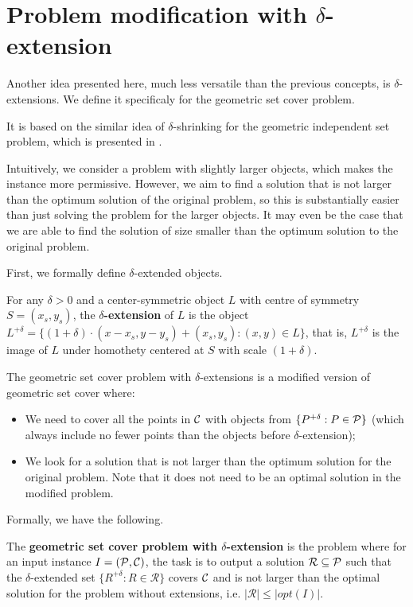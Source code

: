 \section{Problem modification with $\delta$-extension}

Another idea presented here, much less versatile than the previous concepts,
is $\delta$-extensions.
We define it specificaly for the geometric set cover problem.

It is based on the similar idea of $\delta$-shrinking
for the geometric independent set problem,
which is presented in \cite{shrinking}.

Intuitively, we consider a problem with slightly larger objects,
which makes the instance more permissive.
However, we aim to find a solution that
is not larger than the
optimum solution of the original problem,
so this is substantially easier than just
solving the problem for the larger objects.
It may even be the case
that we are able to find the solution
of size smaller than the optimum solution
to the original problem.

First, we formally define $\delta$-extended objects.

\begin{defi}
For any $\delta > 0$ and a center-symmetric object $L$ with
centre of symmetry $S = (x_s, y_s)$,
the \textbf{$\delta$-extension} of $L$ is the object $L^{+\delta} =
\{(1 + \delta)\cdot(x - x_s, y - y_s) + (x_s, y_s) : (x, y) \in L\}$,
that is, $L^{+\delta}$ is the image of $L$ under homothety centered
at $S$ with scale $(1+\delta)$.
\end{defi}


The geometric set cover problem with $\delta$-extensions
is a modified version of geometric set cover where:
\begin{itemize}
\item We need to cover all the points in $\mathcal{C}$
with objects from $\{P^{+\delta} : P \in \mathcal{P}\}$ (which always 
include no fewer points than the objects
before $\delta$-extension);
\item We look for a solution that is not larger than the optimum solution
for the original problem.
Note that it does not need to be an optimal solution in
the modified problem.
\end{itemize}

Formally, we have the following.

\begin{defi}
The \textbf{geometric set cover problem
with $\delta$-extension} is the problem where for an input instance
$I=(\mathcal{P}, \mathcal{C})$,
the task is to output a solution $\mathcal{R} \subseteq \mathcal{P}$
such that the $\delta$-extended set
$\{ R^{+\delta} :  R \in \mathcal{R} \}$ covers $\mathcal{C}$
and is not larger than the optimal solution for the problem without
extensions, i.e. $|\mathcal{R}| \le |opt(I)|$.
\end{defi}

